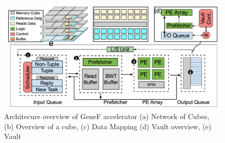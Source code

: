 \documentclass[9pt,conference]{IEEEtran}
\begin{document}
\begin{figure}[t]
\centering
\includegraphics[scale=0.55]{Conference-LaTeX-template_10-17-19/fig/test.png}
\caption{Architecure overview of GeneF accelerator (a) Network of Cubes, (b) Overview of a cube, (c) Data Mapping (d) Vault overview, (e) Vault}
\label{fig:arch_design}
\end{figure}

\end{document}
